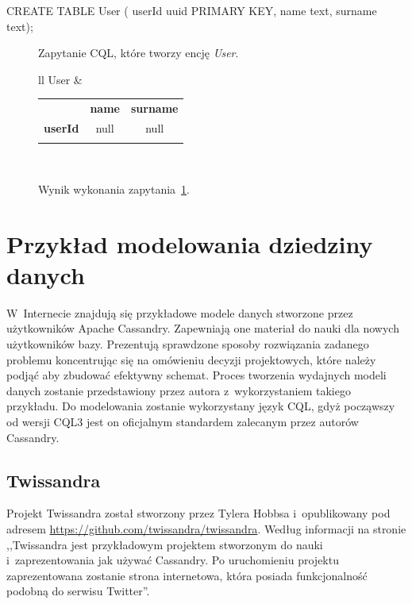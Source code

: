\begin{verbbox}
	CREATE TABLE User (
	    userId uuid PRIMARY KEY,
	    name text,
	    surname text);
\end{verbbox}

\begin{figure}[ht!]
	\centering
	\theverbbox

	\caption{Zapytanie CQL, które tworzy encję \emph{User}.}
	\label{lst:cql_example}
\end{figure}

\begin{figure}[ht!]
	\centering

	\begin{tabular}{ll}
		User &
		\begin{tabular}{|l||c|c|}
			\hhline{|-||--|}
			 & \textbf{name} & \textbf{surname} \\
			\hhline{|~||==|}
			\textbf{userId} & null & null \\
			\hhline{|-||--|}
		\end{tabular} \\
	\end{tabular}

	\caption{Wynik wykonania zapytania~\ref{lst:cql_example}.}
	\label{tab:cql_example_query_result}
\end{figure}

\section{Przykład modelowania dziedziny danych}
\label{sec:cassandra_modelling_examples}

W~Internecie znajdują się przykładowe modele danych stworzone przez użytkowników Apache Cassandry. Zapewniają one materiał do nauki dla nowych użytkowników bazy. Prezentują sprawdzone sposoby rozwiązania zadanego problemu koncentrując się na omówieniu decyzji projektowych, które należy podjąć aby zbudować efektywny schemat. Proces tworzenia wydajnych modeli danych zostanie przedstawiony przez autora z~wykorzystaniem takiego przykładu. Do modelowania zostanie wykorzystany język CQL, gdyż począwszy od wersji CQL3 jest on oficjalnym standardem zalecanym przez autorów Cassandry. 

\subsection{Twissandra}
\label{sec:twissandra}

Projekt Twissandra został stworzony przez Tylera Hobbsa i~opublikowany pod adresem \url{https://github.com/twissandra/twissandra}. Według informacji na stronie ,,Twissandra jest przykładowym projektem stworzonym do nauki i~zaprezentowania jak używać Cassandry. Po uruchomieniu projektu zaprezentowana zostanie strona internetowa, która posiada funkcjonalność podobną do serwisu Twitter''.~\cite{twissandra} 

